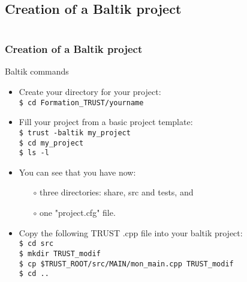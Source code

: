 \documentclass[10pt, hyperref={unicode=true,pdfusetitle, bookmarks=true,bookmarksnumbered=false,bookmarksopen=false, breaklinks=false,pdfborder={0 0 1},backref=true,colorlinks=true,linkcolor=darkblue,pageanchor, urlcolor=darkblue}]{beamer}
\begin{document}
\subsection{{\bf{Creation of a Baltik project}}}
\begin{frame}
\begin{columns}[c] 
\tableofcontents[sections={1-4},currentsection, currentsubsection]
\tableofcontents[sections={5-8},currentsection, currentsubsection]
\end{columns}
\end{frame}
\begin{frame}
\frametitle{Creation of a Baltik project}
\begin{block}{Baltik commands}

\begin{itemize}
\item Create your directory for your project:\\
\texttt{\$ cd Formation\_TRUST/yourname}

\item Fill your project from a basic project template:\\
\texttt{\$ trust -baltik my\_project}\\
\texttt{\$ cd my\_project}\\

\texttt{\$ ls -l}

\item You can see that you have now:
    \begin{itemize}
    \item [$\circ$] three directories: share, src and tests, and
    \item [$\circ$] one "project.cfg" file.
    \end{itemize}

\item Copy the following TRUST .cpp file into your baltik project:\\
\texttt{\$ cd src}\\
\texttt{\$ mkdir TRUST\_modif} \\
\texttt{\$ cp \$TRUST\_ROOT/src/MAIN/mon\_main.cpp TRUST\_modif}\\
\texttt{\$ cd ..}
\end{itemize}

\end{block}
\end{frame}
\end{document}
